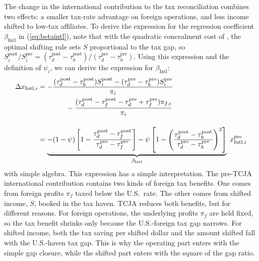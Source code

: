 \documentclass[11pt,letterpaper]{article}
\begin{document}
The change in the international contribution to the tax reconciliation
combines two effects: a smaller
tax-rate advantage on foreign operations, and less income shifted to low-tax
affiliates. To derive the expression for the regression coefficient
$\beta_{\text{Intl}}$ in
(\ref{eq:betaintl}), note that with the quadratic concealment cost of
\citet{HinesRice1994}, the optimal shifting rule sets $S$ proportional
to the tax gap, so
$S_i^{\text{post}}/S_i^{\text{pre}}
=(\tau_d^{\text{post}}-\tau_h^{\text{post}})/
(\tau_d^{\text{pre}}-\tau_h^{\text{pre}})$. Using this 
expression and the definition of $\psi_i$, we can
derive the expression for $\beta_{\text{Intl}}$: 
\begin{align*}
  \Delta x_{\text{Intl},i} 
             & = -\frac{(\tau_d^{\text{post}}-\tau_h^{\text{post}})S_i^{\text{post}}
                      -(\tau_d^{\text{pre}}-\tau_h^{\text{pre}})S_i^{\text{pre}}}{\pi_i}\\
             &\qquad\qquad
                 -\frac{(\tau_d^{\text{post}}-\tau_f^{\text{post}}-
                    \tau_d^{\text{pre}}+\tau_f^{\text{pre}})\pi_{f,i}}{\pi_i}\\
  \noalign{\bigskip}
            & = \underbrace{-(1-\psi)\left[1-\frac{\tau_d^{\text{post}}-\tau_f^{\text{post}}}
                                                 {\tau_d^{\text{pre}}-\tau_f^{\text{pre}}}\right]
                              -\psi\left[1-\left(\frac{\tau_d^{\text{post}}-\tau_h^{\text{post}}}
                                                    {\tau_d^{\text{pre}}-\tau_h^{\text{pre}}}\right)^{2}\right]}
                _{\beta_{\text{Intl}}}\; x^{\text{pre}}_{\text{Intl},i} 
\end{align*}
with simple algebra.
This expression has a simple interpretation. The pre-TCJA international contribution
contains two kinds of foreign tax benefits. One comes from foreign
profits $\pi_f$ taxed below the U.S.~rate. The other comes from shifted income, $S$, booked in
the tax haven.  TCJA reduces both benefits, but for different reasons. For foreign
operations, the underlying profits $\pi_f$ are held fixed, so the tax benefit
shrinks only because the U.S.-foreign tax gap narrows. For shifted income, both
the tax saving per shifted dollar and the amount shifted fall with the
U.S.-haven tax gap. This is why the operating part enters with the simple gap
closure, while the shifted part enters with the square of the gap ratio.
\end{document}
